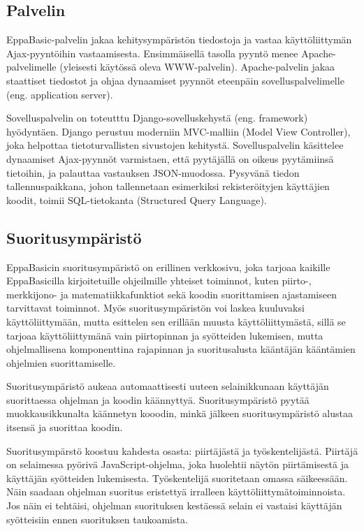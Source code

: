 \subsection{Palvelin}
EppaBasic-palvelin jakaa kehitysympäristön tiedostoja ja
vastaa käyttöliittymän Ajax-pyyntöihin vastaamisesta. Ensimmäisellä
tasolla pyyntö menee Apache-palvelimelle (yleisesti käytössä oleva WWW-palvelin).
Apache-palvelin jakaa staattiset tiedostot ja ohjaa dynaamiset pyynnöt
eteenpäin sovelluspalvelimelle (eng. application server).

Sovelluspalvelin on toteutttu Django-sovelluskehystä (eng. framework)
hyödyntäen. Django perustuu moderniin MVC-malliin (Model View Controller),
joka helpottaa tietoturvallisten sivustojen kehitystä.
Sovelluspalvelin käsittelee dynaamiset Ajax-pyynnöt
varmistaen, että pyytäjällä on oikeus pyytämiinsä tietoihin,
ja palauttaa vastauksen JSON-muodossa. Pysyvänä tiedon
tallennuspaikkana, johon tallennetaan esimerkiksi rekisteröityjen
käyttäjien koodit, toimii SQL-tietokanta (Structured Query Language).

\subsection{Suoritusympäristö}
EppaBasicin suoritusympäristö on erillinen verkkosivu,
joka tarjoaa kaikille EppaBasicilla kirjoitetuille
ohjeilmille yhteiset toiminnot, kuten piirto-,
merkkijono- ja matematiikkafunktiot sekä
koodin suorittamisen ajastamiseen tarvittavat toiminnot.
Myös suoritusympäristön voi laskea kuuluvaksi käyttöliittymään,
mutta esittelen sen erillään muusta käyttöliittymästä,
sillä se tarjoaa käyttöliittymänä vain piirtopinnan
ja syötteiden lukemisen, mutta ohjelmallisena
komponenttina rajapinnan ja suoritusalusta kääntäjän
kääntämien ohjelmien suorittamiselle.

Suoritusympäristö aukeaa automaattisesti uuteen selainikkunaan
käyttäjän suorittaessa ohjelman ja koodin käännyttyä.
Suoritusympäristö pyytää muokkausikkunalta käännetyn kooodin,
minkä jälkeen suoritusympäristö alustaa itsensä ja suorittaa koodin.

Suoritusympärstö koostuu kahdesta osasta:
piirtäjästä ja työskentelijästä.
Piirtäjä on selaimessa pyörivä
JavaScript-ohjelma, joka huolehtii
näytön piirtämisestä ja käyttäjän syötteiden lukemisesta.
Työskentelijä suoritetaan omassa säikeessään.
Näin saadaan ohjelman suoritus eristettyä
irralleen käyttöliittymätoiminnoista.
Jos näin ei tehtäisi, ohjelman suorituksen
kestäessä selain ei vastaisi käyttäjän
syötteisiin ennen suorituksen taukoamista.

